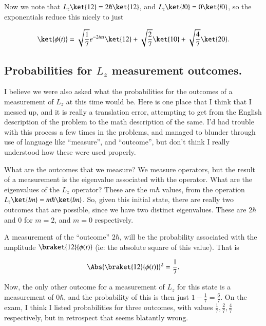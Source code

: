 Now we note that $L_z \ket{12} = 2 \hbar \ket{12}$, and $L_z \ket{ l 0} = 0 \ket{l 0}$, so the exponentials reduce this nicely to just

\begin{equation}\label{eqn:qmIexam2010:40}
\ket{\phi(t)} = 
\sqrt{\frac{1}{7}} e^{ -2 i \alpha t } \ket{ 12 }
+\sqrt{\frac{2}{7}} \ket{ 10 }
+\sqrt{\frac{4}{7}} \ket{ 20 }.
\end{equation}

\subsection{Probabilities for $L_z$ measurement outcomes.}

I believe we were also asked what the probabilities for the outcomes of a measurement of $L_z$ at this time would be.  Here is one place that I think that I messed up, and it is really a translation error, attempting to get from the English description of the problem to the math description of the same.  I'd had trouble with this process a few times in the problems, and managed to blunder through use of language like ``measure'', and ``outcome'', but don't think I really understood how these were used properly.

What are the outcomes that we measure?  We measure operators, but the result of a measurement is the eigenvalue associated with the operator.  What are the eigenvalues of the $L_z$ operator?  These are the $m \hbar$ values, from the operation $L_z \ket{l m} = m \hbar \ket{l m}$.  So, given this initial state, there are really two outcomes that are possible, since we have two distinct eigenvalues.  These are $2 \hbar$ and $0$ for $m = 2$, and $m= 0$ respectively.

A measurement of the ``outcome'' $2 \hbar$, will be the probability associated with the amplitude $\braket{ 1 2 }{\phi(t)}$ (ie: the absolute square of this value).  That is

\begin{equation}\label{eqn:qmIexam2010:50}
\Abs{ \braket{ 1 2 }{\phi(t) } }^2 = \frac{1}{7}.
\end{equation}

Now, the only other outcome for a measurement of $L_z$ for this state is a measurement of $0 \hbar$, and the probability of this is then just $1 - \frac{1}{7} = \frac{6}{7}$.  On the exam, I think I listed probabilities for three outcomes, with values $\frac{1}{7}, \frac{2}{7}, \frac{4}{7}$ respectively, but in retrospect that seems blatantly wrong.

